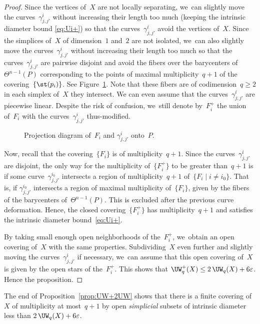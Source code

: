 \begin{proof}
Since the vertices of~$X$ are not locally separating, we~can slightly move the curves~$\gamma^i_{j,j'}$ without increasing their length too much (keeping the intrinsic diameter bound \eqref{eq:Ui+}) so that the curves~$\gamma^i_{j,j'}$ avoid the vertices of~$X$. Since the simplices of~$X$ of dimension~$1$ and~$2$ are not isolated, we~can also slightly move the curves~$\gamma^i_{j,j'}$ without increasing their length too much so that the curves~$\gamma^i_{j,j'}$ are pairwise disjoint and avoid the fibers over the barycenters of~$\Theta^{n-1}(P)$ corresponding to the points of maximal multiplicity~$q+1$ of the covering~$\{\st(p_i)\}$.
See Figure~\ref{fig:projection}.
Note that these fibers are of codimension~$q \geq 2$ in each simplex of~$X$ they intersect.
We can even assume that the curves~$\gamma^i_{j,j'}$ are piecewise linear.
Despite the risk of confusion, we~still denote by~$F_i^+$ the union of~$F_i$ with the curves~$\gamma^i_{j,j'}$ thus-modified.

\begin{figure}[htbp!]
\vspace{-1cm}
\hspace{0cm}
\def\svgwidth{7cm}

\caption{Projection diagram of~$F_i$ and $\gamma^i_{j,j'}$ onto~$P$.} \label{fig:projection}
\end{figure}

Now, recall that the covering~$\{F_i\}$ is of multiplicity~$q+1$.
Since the curves~$\gamma^i_{j,j'}$ are disjoint, the only way for the multiplicity of~$\{F_i^+\}$ to be greater than~$q+1$ is if some curve~$\gamma^{i_0}_{j,j'}$ intersects a region of multiplicity~$q+1$ of~$\{F_i \mid i \neq i_0\}$.
That is, if $\gamma^{i_0}_{j,j'}$ intersects a region of maximal multiplicity of~$\{F_i\}$, given by the fibers of the barycenters of~$\Theta^{n-1}(P)$.
This is excluded after the previous curve deformation.
Hence, the closed covering~$\{F_i^+\}$ has multiplicity~$q+1$ and satisfies the intrinsic diameter bound~\eqref{eq:Ui+}.

By taking small enough open neighborhoods of the~$F_i^+$, we~obtain an open covering of~$X$ with the same properties.
Subdividing~$X$ even further and slightly moving the curves~$\gamma^i_{j,j'}$ if necessary, we~can assume that this open covering of~$X$ is given by the open stars of the~$F_i^+$.
This shows that $\UW^+_q(X) \leq 2 \, \UW_q(X) + 6 \varepsilon$.
Hence the proposition.
\end{proof}

\begin{remark} \label{rem:UW+2UW}
The end of Proposition~\ref{prop:UW+2UW} shows that there is a finite covering of~$X$ of multiplicity at most~$q+1$ by open \emph{simplicial} subsets of intrinsic diameter less than $2 \, \UW_q(X) + 6 \varepsilon$.
\end{remark}

